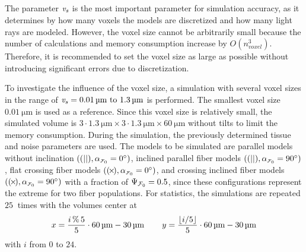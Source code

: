 \subsection{\Voxelsize{} \texorpdfstring{\voxelsize{}}{}} \label{sec:simvoxelsize}
%
The parameter \Voxelsize{} $\textnormal{$\mathit{v_{s}}$}$ is the most important parameter for simulation accuracy, as it determines by how many voxels the models are discretized and how many light rays are modeled.
However, the voxel size cannot be arbitrarily small because the number of calculations and memory consumption increase by $O(n_{\mathit{voxel}}^3)$.
Therefore, it is recommended to set the voxel size as large as possible without introducing significant errors due to discretization.
\par
%
To investigate the influence of the voxel size, a simulation with several voxel sizes in the range of $\voxelsize = \SIrange{0.01}{1.3}{\micro\meter}$ is performed.
The smallest voxel size $\SI{0.01}{\micro\meter}$ is used as a reference.
Since this voxel size is relatively small, the simulated volume is $3 \cdot \SI{1.3}{\micro\meter} \times 3 \cdot \SI{1.3}{\micro\meter} \times \SI{60}{\micro\meter}$ without tilts to limit the memory consumption.
During the simulation, the previously determined tissue and noise parameters are used.
The models to be simulated are parallel models without inclination $\left( \pfbs, \modelInc = \SI{0}{\degree} \right)$, inclined parallel fiber models $\left( \pfbs, \modelInc = \SI{90}{\degree} \right)$, flat crossing fiber models $\left( \cfbs, \modelInc = \SI{0}{\degree} \right)$, and crossing inclined fiber models $\left( \cfbs, \modelInc = \SI{90}{\degree} \right)$ with a fraction of $\textnormal{$\Psi_{\textnormal{$\mathcal{F}_0$}}$} = \SI{0.5}{}$, since these configurations represent the extreme for two fiber populations.
For statistics, the simulations are repeated $\SI{25}{}$ times with the volumes center at
\begin{align}
    x=\frac{i\,\%\,5}{5} \cdot \SI{60}{\micro\meter} - \SI{30}{\micro\meter} \hspace{5ex}
    y=\frac{\lfloor i/5\rfloor}{5} \cdot \SI{60}{\micro\meter} - \SI{30}{\micro\meter}
\end{align}
with $i$ from $0$ to $24$.
%
%
%
